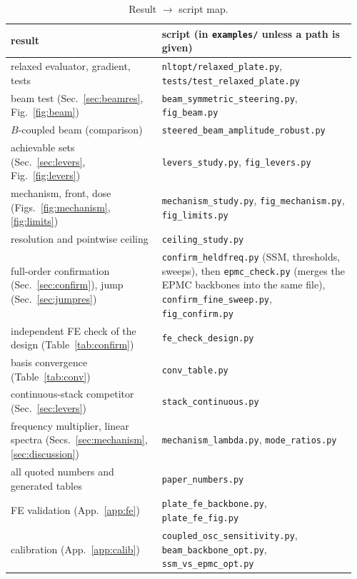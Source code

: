 \begin{table}[h]
\centering\footnotesize
\caption{Result $\to$ script map.}\label{tab:repro}
\begin{tabular}{@{}>{\raggedright\arraybackslash}p{0.42\linewidth}>{\raggedright\arraybackslash}p{0.54\linewidth}@{}}
\toprule
result & script (in \texttt{examples/} unless a path is given)\\ \midrule
relaxed evaluator, gradient, tests & \texttt{nltopt/relaxed\_plate.py}, \texttt{tests/test\_relaxed\_plate.py}\\
beam test (Sec.~\ref{sec:beamres}, Fig.~\ref{fig:beam}) & \texttt{beam\_symmetric\_steering.py}, \texttt{fig\_beam.py}\\
$B$-coupled beam (comparison) & \texttt{steered\_beam\_amplitude\_robust.py}\\
achievable sets (Sec.~\ref{sec:levers}, Fig.~\ref{fig:levers}) & \texttt{levers\_study.py}, \texttt{fig\_levers.py}\\
mechanism, front, dose (Figs.~\ref{fig:mechanism}, \ref{fig:limits}) & \texttt{mechanism\_study.py}, \texttt{fig\_mechanism.py}, \texttt{fig\_limits.py}\\
resolution and pointwise ceiling & \texttt{ceiling\_study.py}\\
full-order confirmation (Sec.~\ref{sec:confirm}), jump (Sec.~\ref{sec:jumpres}) & \texttt{confirm\_heldfreq.py} (SSM, thresholds, sweeps), then \texttt{epmc\_check.py} (merges the EPMC backbones into the same file), \texttt{confirm\_fine\_sweep.py}, \texttt{fig\_confirm.py}\\
independent FE check of the design (Table~\ref{tab:confirm}) & \texttt{fe\_check\_design.py}\\
basis convergence (Table~\ref{tab:conv}) & \texttt{conv\_table.py}\\
continuous-stack competitor (Sec.~\ref{sec:levers}) & \texttt{stack\_continuous.py}\\
frequency multiplier, linear spectra (Secs.~\ref{sec:mechanism}, \ref{sec:discussion}) & \texttt{mechanism\_lambda.py}, \texttt{mode\_ratios.py}\\
all quoted numbers and generated tables & \texttt{paper\_numbers.py}\\
FE validation (App.~\ref{app:fe}) & \texttt{plate\_fe\_backbone.py}, \texttt{plate\_fe\_fig.py}\\
calibration (App.~\ref{app:calib}) & \texttt{coupled\_osc\_sensitivity.py}, \texttt{beam\_backbone\_opt.py}, \texttt{ssm\_vs\_epmc\_opt.py}\\
\bottomrule
\end{tabular}
\end{table}
